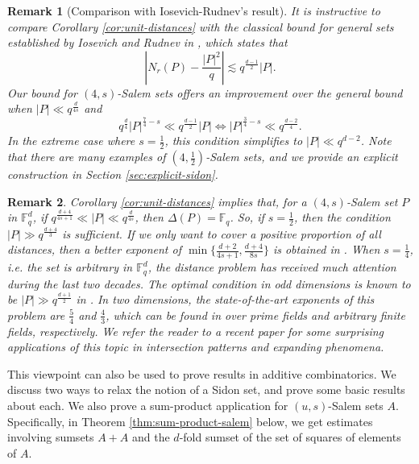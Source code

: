 \documentclass{article}
\newtheorem{remark}{Remark}[section]
\def\steven#1{\noindent
\textcolor{red}
{\textsc{(Steven:}
\textsf{#1})}}
\begin{document}

\begin{remark}[Comparison with Iosevich-Rudnev's result]
    It is instructive to compare Corollary \ref{cor:unit-distances} with the classical bound for general sets established by Iosevich and Rudnev in \cite{iosevich-Rudnev-07}, which states that
    \[
    \left| N_r(P) - \frac{|P|^2}{q} \right| \lesssim q^{\frac{d-1}{2}} |P|.
    \]
    Our bound for $(4,s)$-Salem sets offers an improvement over the general bound when $|P| \ll q^{\frac{d}{4s}}$ and
    \[
    q^{\frac{d}{4}} |P|^{\frac{7}{4}-s} \ll q^{\frac{d-1}{2}} |P| \iff |P|^{\frac{3}{4}-s} \ll q^{\frac{d-2}{4}}.
    \]
    In the extreme case where $s=\frac{1}{2}$, this condition simplifies to $|P| \ll q^{d-2}$. Note that there are many examples of $(4, \frac{1}{2})$-Salem sets, and we provide an explicit construction in Section \ref{sec:explicit-sidon}.
\end{remark}
\begin{remark}
    Corollary \ref{cor:unit-distances} implies that, for a $(4, s)$-Salem set $P$ in $\mathbb{F}_q^d$, if $q^{\frac{d+4}{4s+1}}\ll |P| \ll q^{\frac{d}{4s}}$, then $\Delta(P)=\mathbb{F}_q$. So, if $s=\frac{1}{2}$, then the condition $|P|\gg q^\frac{d+4}{3}$ is sufficient. 
    If we only want to cover a positive proportion of all distances, then a better exponent of $\min \big\{ \frac{d+2}{4s+1}, \frac{d+4}{8s} \big\}$ is obtained in \cite{CGKPTZ25}. When $s=\frac{1}{4}$, i.e. the set is arbitrary in $\mathbb{F}_q^d$, the distance problem has received much attention during the last two decades. 
    The optimal condition in odd dimensions is known to be $|P|\gg q^{\frac{d+1}{2}}$ in \cite{HIKR11}. 
    In two dimensions, the state-of-the-art exponents of this problem  are $\frac{5}{4}$ and $\frac{4}{3}$, which can be found in \cite{CEHIK12, MPPRS} over prime fields and arbitrary finite fields, respectively. We refer the reader to a recent paper \cite{PY25} for some surprising applications of this topic in intersection patterns and expanding phenomena.
\end{remark}

This viewpoint can also be used to prove results in additive combinatorics. We discuss two ways to relax the notion of a Sidon set, and prove some basic results about each. We also prove a sum-product application for $(u,s)$-Salem sets $A$. Specifically, in Theorem \ref{thm:sum-product-salem} below, we get estimates involving sumsets $A+A$ and the $d$-fold sumset of the set of squares of elements of $A.$
\end{document}
